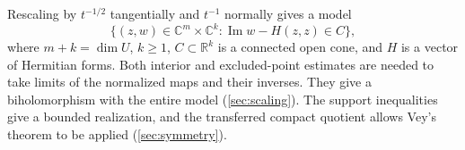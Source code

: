 \documentclass[11pt,a4paper]{amsart}
\begin{document}
Rescaling by $t^{-1/2}$ tangentially and $t^{-1}$ normally gives a model
\[
 \{(z,w)\in\mathbb{C}^m\times\mathbb{C}^k:
   \operatorname{Im} w-H(z,z)\in C\},
\]
where $m+k=\dim U$, $k\geq1$, $C\subset\mathbb{R}^k$ is a connected open cone, and $H$ is a vector of Hermitian forms. Both interior and excluded-point estimates are needed to take limits of the normalized maps and their inverses. They give a biholomorphism with the entire model (\cref{sec:scaling}). The support inequalities give a bounded realization, and the transferred compact quotient allows Vey's theorem to be applied (\cref{sec:symmetry}).







\printbibliography
\end{document}
